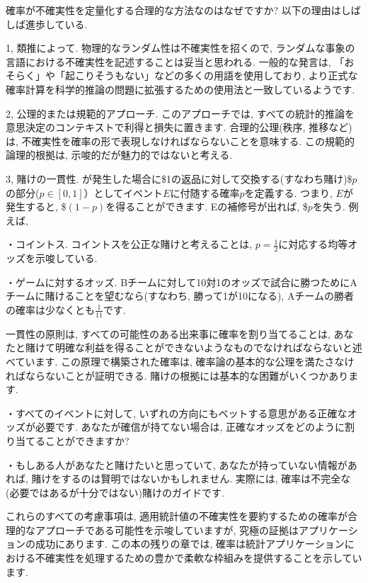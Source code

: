 \documentclass[10pt,dvipdfmx,a4]{beamer}
\begin{document}
\begin{frame}
確率が不確実性を定量化する合理的な方法なのはなぜですか?
以下の理由はしばしば進歩している.

1, 類推によって.
物理的なランダム性は不確実性を招くので, ランダムな事象の言語における不確実性を記述することは妥当と思われる.
一般的な発言は, 「おそらく」や「起こりそうもない」などの多くの用語を使用しており, より正式な確率計算を科学的推論の問題に拡張するための使用法と一致しているようです.

2, 公理的または規範的アプローチ.
このアプローチでは, すべての統計的推論を意思決定のコンテキストで利得と損失に置きます.
合理的公理(秩序, 推移など)は, 不確実性を確率の形で表現しなければならないことを意味する.
この規範的論理的根拠は, 示唆的だが魅力的ではないと考える.

3, 賭けの一貫性.
が発生した場合に\$1の返品に対して交換する(すなわち賭け)\$$p$の部分($p\in[0,1]$）としてイベント$E$に付随する確率$p$を定義する.
つまり, $E$が発生すると, \$$(1-p)$を得ることができます.
Eの補修号が出れば, \$$p$を失う.
例えば,

・コイントス.
コイントスを公正な賭けと考えることは, $p=\tfrac{1}{2}$に対応する均等オッズを示唆している.
\end{frame}


\begin{frame}
・ゲームに対するオッズ.
Bチームに対して10対1のオッズで試合に勝つためにAチームに賭けることを望むなら(すなわち, 勝って1が10になる), Aチームの勝者の確率は少なくとも$\tfrac{1}{11}$です.

一貫性の原則は, すべての可能性のある出来事に確率を割り当てることは, あなたと賭けて明確な利益を得ることができないようなものでなければならないと述べています.
この原理で構築された確率は, 確率論の基本的な公理を満たさなければならないことが証明できる.
賭けの根拠には基本的な困難がいくつかあります.

・すべてのイベントに対して, いずれの方向にもベットする意思がある正確なオッズが必要です.
あなたが確信が持てない場合は, 正確なオッズをどのように割り当てることができますか?

・もしある人があなたと賭けたいと思っていて, あなたが持っていない情報があれば, 賭けをするのは賢明ではないかもしれません.
実際には, 確率は不完全な(必要ではあるが十分ではない)賭けのガイドです.

これらのすべての考慮事項は, 適用統計値の不確実性を要約するための確率が合理的なアプローチである可能性を示唆していますが, 究極の証拠はアプリケーションの成功にあります.
この本の残りの章では, 確率は統計アプリケーションにおける不確実性を処理するための豊かで柔軟な枠組みを提供することを示しています.
\end{frame}
\end{document}
